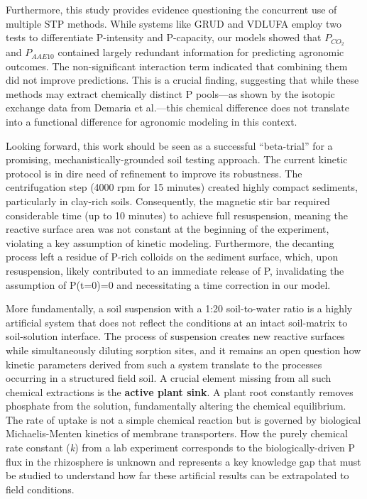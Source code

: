 \documentclass[
  a4paper,
]{article}
\begin{document}
Furthermore, this study provides evidence questioning the concurrent use
of multiple STP methods. While systems like GRUD and VDLUFA employ two
tests to differentiate P-intensity and P-capacity, our models showed
that \(P_{CO_2}\) and \(P_{AAE10}\) contained largely redundant
information for predicting agronomic outcomes. The non-significant
interaction term indicated that combining them did not improve
predictions. This is a crucial finding, suggesting that while these
methods may extract chemically distinct P pools---as shown by the
isotopic exchange data from Demaria et al.---this chemical difference
does not translate into a functional difference for agronomic modeling
in this context.

Looking forward, this work should be seen as a successful ``beta-trial''
for a promising, mechanistically-grounded soil testing approach. The
current kinetic protocol is in dire need of refinement to improve its
robustness. The centrifugation step (4000 rpm for 15 minutes) created
highly compact sediments, particularly in clay-rich soils. Consequently,
the magnetic stir bar required considerable time (up to 10 minutes) to
achieve full resuspension, meaning the reactive surface area was not
constant at the beginning of the experiment, violating a key assumption
of kinetic modeling. Furthermore, the decanting process left a residue
of P-rich colloids on the sediment surface, which, upon resuspension,
likely contributed to an immediate release of P, invalidating the
assumption of P(t=0)=0 and necessitating a time correction in our model.

More fundamentally, a soil suspension with a 1:20 soil-to-water ratio is
a highly artificial system that does not reflect the conditions at an
intact soil-matrix to soil-solution interface. The process of suspension
creates new reactive surfaces while simultaneously diluting sorption
sites, and it remains an open question how kinetic parameters derived
from such a system translate to the processes occurring in a structured
field soil. A crucial element missing from all such chemical extractions
is the \textbf{active plant sink}. A plant root constantly removes
phosphate from the solution, fundamentally altering the chemical
equilibrium. The rate of uptake is not a simple chemical reaction but is
governed by biological Michaelis-Menten kinetics of membrane
transporters. How the purely chemical rate constant (\emph{k}) from a
lab experiment corresponds to the biologically-driven P flux in the
rhizosphere is unknown and represents a key knowledge gap that must be
studied to understand how far these artificial results can be
extrapolated to field conditions.
\end{document}
